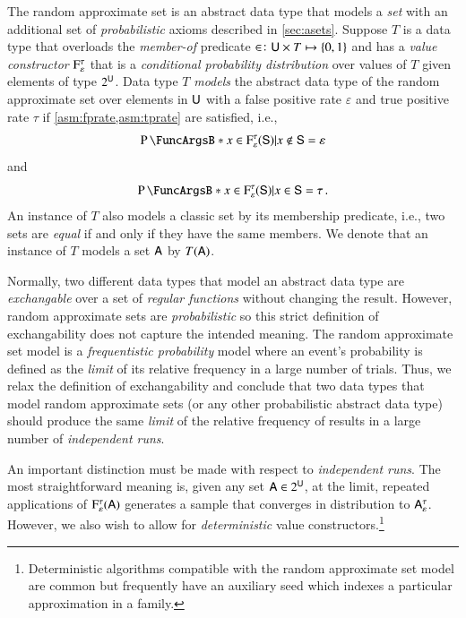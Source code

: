 \documentclass[10pt,final,hidelinks]{article}
\numberwithin{equation}{section}
\providecommand{\Given}{\vert}
\newcommand{\PS}[1]{2^{#1}}
\newcommand{\tprate}{\tau}
\newcommand{\fprate}{\varepsilon}
\theoremstyle{plain}
\begin{document}

The random approximate set is an abstract data type that models a \emph{set} with an additional set of \emph{probabilistic} axioms described in \cref{sec:asets}.
Suppose $T$ is a data type that overloads the \emph{member-of} predicate $\SetContains \colon \Set{U} \times T \mapsto \{0,1\}$ and has a \emph{value constructor} $\ctor{\fprate}{\tprate}$ that is a \emph{conditional probability distribution} over values of $T$ given elements of type $\PS{\Set{U}}$.
Data type $T$ \emph{models} the abstract data type of the random approximate set over elements in $\Set{U}$ with a false positive rate $\fprate$ and true positive rate $\tprate$ if \cref{asm:fprate,asm:tprate} are satisfied, i.e.,
\begin{equation}
	\Prob{\SetContains[x][\ctor{\fprate}{\tprate}(\Set{S})] \Given \SetNotContains[x][\Set{S}]} = \fprate
\end{equation}
and
\begin{equation}
	\Prob{\SetContains[x][\ctor{\fprate}{\tprate}(\Set{S})] \Given \SetContains[x][\Set{S}]} = \tprate\,.
\end{equation}
An instance of $T$ also models a classic set by its membership predicate, i.e., two sets are \emph{equal} if and only if they have the same members. We denote that an instance of $T$ models a set $\Set{A}$ by $T(\Set{A})$.

Normally, two different data types that model an abstract data type are \emph{exchangable} over a set of \emph{regular functions} without changing the result.
However, random approximate sets are \emph{probabilistic} so this strict definition of exchangability does not capture the intended meaning.
The random approximate set model is a \emph{frequentistic probability} model where an event's probability is defined as the \emph{limit} of its relative frequency in a large number of trials.
Thus, we relax the definition of exchangability and conclude that two data types that model random approximate sets (or any other probabilistic abstract data type) should produce the same \emph{limit} of the relative frequency of results in a large number of \emph{independent runs}.

An important distinction must be made with respect to \emph{independent runs}.
The most straightforward meaning is, given any set $\Set{A} \in \PS{\Set{U}}$, at the limit, repeated applications of $\ctor{\fprate}{\tprate}(\Set{A})$ generates a sample that converges in distribution to $\ASet{A}[\fprate][\tprate]$.
However, we also wish to allow for \emph{deterministic} value constructors.\footnote{Deterministic algorithms compatible with the random approximate set model are common but frequently have an auxiliary seed which indexes a particular approximation in a family.}
\end{document}
